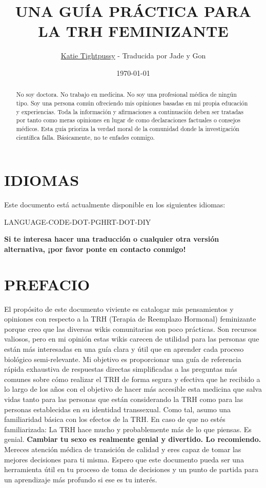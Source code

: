 \documentclass{article}
\title{UNA GUÍA PRÁCTICA PARA LA TRH FEMINIZANTE}
\author{\href{https://katea.gay/}{Katie Tightpussy} - Traducida por Jade y Gon}
\date{\today}
\begin{document}
\maketitle
\tableofcontents
\begin{abstract}
  No soy doctora. No trabajo en medicina. No soy una profesional médica de ningún tipo. Soy una persona común ofreciendo mis opiniones basadas en mi propia educación y experiencias. Toda la información y afirmaciones a continuación deben ser tratadas por tanto como meras opiniones en lugar de como declaraciones factuales o consejos médicos. Esta guía prioriza la verdad moral de la comunidad donde la investigación científica falla. Básicamente, no te enfades conmigo.
\end{abstract}

\section*{IDIOMAS}

Este documento está actualmente disponible en los siguientes idiomas:

LANGUAGE-CODE-DOT-PGHRT-DOT-DIY

\noindent\textbf{Si te interesa hacer una traducción o cualquier otra versión alternativa, ¡por favor ponte en contacto conmigo!}



\section{PREFACIO}

El propósito de este documento viviente es catalogar mis pensamientos y opiniones con respecto a la TRH (Terapia de Reemplazo Hormonal) feminizante porque creo que las diversas wikis comunitarias son poco prácticas. Son recursos valiosos, pero en mi opinión estas wikis carecen de utilidad para las personas que están más interesadas en una guía clara y útil que en aprender cada proceso biológico semi-relevante. Mi objetivo es proporcionar una guía de referencia rápida exhaustiva de respuestas directas simplificadas a las preguntas más comunes sobre cómo realizar el TRH de forma segura y efectiva que he recibido a lo largo de los años con el objetivo de hacer más accesible esta medicina que salva vidas tanto para las personas que están considerando la TRH como para las personas establecidas en su identidad transsexual. Como tal, asumo una familiaridad básica con los efectos de la TRH. En caso de que no estés familiarizada: La TRH hace mucho y probablemente más de lo que piensas. Es genial. \textbf{Cambiar tu sexo es realmente genial y divertido. Lo recomiendo.} Mereces atención médica de transición de calidad y eres capaz de tomar las mejores decisiones para ti misma. Espero que este documento pueda ser una herramienta útil en tu proceso de toma de decisiones y un punto de partida para un aprendizaje más profundo si ese es tu interés.
\end{document}
